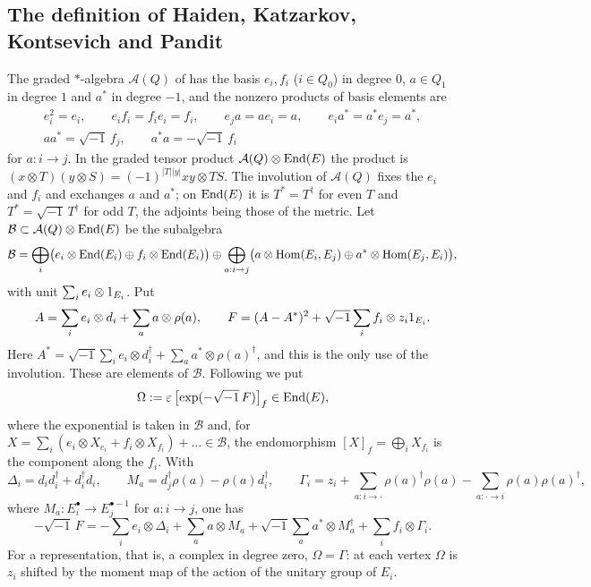 \subsection{The definition of Haiden, Katzarkov, Kontsevich and Pandit}
The graded $*$-algebra $\mathcal A(Q)$ of \cite[Definition~5.13]{hkkp26} has
the basis $e_i,f_i$ ($i\in Q_0$) in degree $0$, $a\in Q_1$ in degree $1$ and
$a^*$ in degree $-1$, and the nonzero products of basis elements are
\begin{gather*}
 e_i^2=e_i,\qquad e_if_i=f_ie_i=f_i,\qquad e_ja=ae_i=a,\qquad e_ia^*=a^*e_j=a^*,\\
 aa^*=\sqrt{-1}\,f_j,\qquad a^*a=-\sqrt{-1}\,f_i
\end{gather*}
for $a:i\to j$. In the graded tensor product
$\mathcal A(Q)\otimes\operatorname{End}(E)$ the product is
$(x\otimes T)(y\otimes S)=(-1)^{|T||y|}xy\otimes TS$. The involution of
$\mathcal A(Q)$ fixes the $e_i$ and $f_i$ and exchanges $a$ and $a^*$; on
$\operatorname{End}(E)$ it is $T^*=T^\dagger$ for even $T$ and $T^*=\sqrt{-1}\,T^\dagger$
for odd $T$, the adjoints being those of the metric. Let
$\mathcal B\subset\mathcal A(Q)\otimes\operatorname{End}(E)$ be the subalgebra
\[
 \mathcal B=\bigoplus_i\bigl(e_i\otimes\operatorname{End}(E_i)\oplus f_i\otimes\operatorname{End}(E_i)\bigr)
 \oplus\bigoplus_{a:i\to j}\bigl(a\otimes\operatorname{Hom}(E_i,E_j)\oplus a^*\otimes\operatorname{Hom}(E_j,E_i)\bigr),
\]
with unit $\sum_ie_i\otimes1_{E_i}$. Put
\[
 A=\sum_ie_i\otimes d_i+\sum_aa\otimes\rho(a),\qquad
 F=(A-A^*)^2+\sqrt{-1}\sum_if_i\otimes z_i1_{E_i} .
\]
Here $A^*=\sqrt{-1}\sum_ie_i\otimes d_i^\dagger+\sum_aa^*\otimes\rho(a)^\dagger$,
and this is the only use of the involution. These are elements of
$\mathcal B$. Following \cite[\S5.4]{hkkp26} we put
\begin{equation}\label{eq:Omegadef}
 \Omega:=\varepsilon\,\bigl[\exp(-\sqrt{-1}\,F)\bigr]_f\in\operatorname{End}(E),
\end{equation}
where the exponential is taken in $\mathcal B$ and, for
$X=\sum_i(e_i\otimes X_{e_i}+f_i\otimes X_{f_i})+\dots\in\mathcal B$, the
endomorphism $[X]_f=\bigoplus_iX_{f_i}$ is the component along the $f_i$.
With
\begin{equation}\label{eq:DeltaMGamma}
 \Delta_i=d_id_i^\dagger+d_i^\dagger d_i,\qquad
 M_a=d_j^\dagger\rho(a)-\rho(a)d_i^\dagger,\qquad
 \Gamma_i=z_i+\sum_{a:i\to\cdot}\rho(a)^\dagger\rho(a)-\sum_{a:\cdot\to i}\rho(a)\rho(a)^\dagger ,
\end{equation}
where $M_a:E_i^\bullet\to E_j^{\bullet-1}$ for $a:i\to j$, one has
\cite[display after Remark~5.15]{hkkp26}
\begin{equation}\label{eq:F}
 -\sqrt{-1}\,F=-\sum_ie_i\otimes\Delta_i+\sum_aa\otimes M_a
 +\sqrt{-1}\sum_aa^*\otimes M_a^\dagger+\sum_if_i\otimes\Gamma_i .
\end{equation}
For a representation, that is, a complex in degree zero, $\Omega=\Gamma$:
at each vertex $\Omega$ is $z_i$ shifted by the moment map of the action of
the unitary group of $E_i$.


